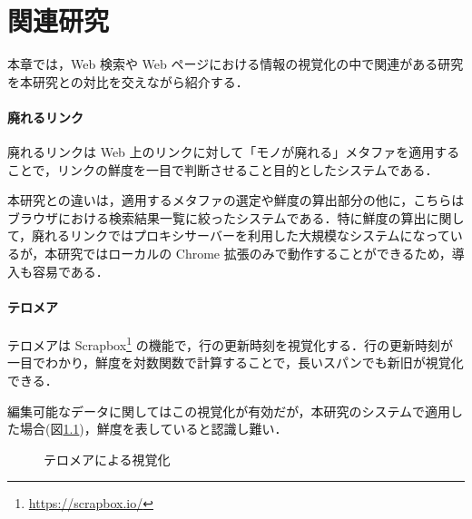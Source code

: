\chapter{関連研究}
\label{chap:survey}

本章では，Web 検索や Web ページにおける情報の視覚化の中で関連がある研究を本研究との対比を交えながら紹介する．

\newpage

\subsubsection{廃れるリンク}

廃れるリンク\cite{dyinglink}は Web 上のリンクに対して「モノが廃れる」メタファを適用することで，リンクの鮮度を一目で判断させること目的としたシステムである．

本研究との違いは，適用するメタファの選定や鮮度の算出部分の他に，こちらはブラウザにおける検索結果一覧に絞ったシステムである．特に鮮度の算出に関して，廃れるリンクではプロキシサーバーを利用した大規模なシステムになっているが，本研究ではローカルの Chrome 拡張のみで動作することができるため，導入も容易である．

\subsubsection{テロメア}

テロメア\cite{telomere}は Scrapbox\footnote{\url{https://scrapbox.io/}} の機能で，行の更新時刻を視覚化する．行の更新時刻が一目でわかり，鮮度を対数関数で計算することで，長いスパンでも新旧が視覚化できる．

編集可能なデータに関してはこの視覚化が有効だが，本研究のシステムで適用した場合(図\ref{fig:ver-telomere})，鮮度を表していると認識し難い．

\begin{figure}[htbp]
  \begin{center}
  \end{center}
  \caption{テロメアによる視覚化}
  \label{fig:ver-telomere}
\end{figure}

